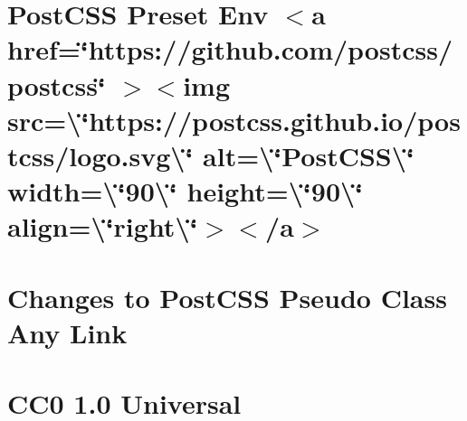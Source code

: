 \documentclass[twoside]{book}
\newcommand{\+}{\discretionary{\mbox{\scriptsize$\hookleftarrow$}}{}{}}
\begin{document}
\chapter{Post\+CSS Preset Env \texorpdfstring{$<$}{<}a href=\char`\"{}https\+://github.\+com/postcss/postcss\char`\"{} \texorpdfstring{$>$}{>}\texorpdfstring{$<$}{<}img src=\textbackslash{}\char`\"{}https\+://postcss.\+github.\+io/postcss/logo.\+svg\textbackslash{}\char`\"{} alt=\textbackslash{}\char`\"{}\+Post\+CSS\textbackslash{}\char`\"{} width=\textbackslash{}\char`\"{}90\textbackslash{}\char`\"{} height=\textbackslash{}\char`\"{}90\textbackslash{}\char`\"{} align=\textbackslash{}\char`\"{}right\textbackslash{}\char`\"{}\texorpdfstring{$>$}{>}\texorpdfstring{$<$}{<}/a\texorpdfstring{$>$}{>}}
\label{md__c___users_vaishnavi_jadhav__desktop__developer_code_mean_stack_example_client_node_modules_postcss_preset_env__r_e_a_d_m_e}

\chapter{Changes to Post\+CSS Pseudo Class Any Link}
\label{md__c___users_vaishnavi_jadhav__desktop__developer_code_mean_stack_example_client_node_modules_pb516996ac8d40f5d5db48a0e5259e7d6}

\chapter{CC0 1.0 Universal}
\label{md__c___users_vaishnavi_jadhav__desktop__developer_code_mean_stack_example_client_node_modules_p1fcc19f218fd3ffeede9709eafb14367}

\end{document}
